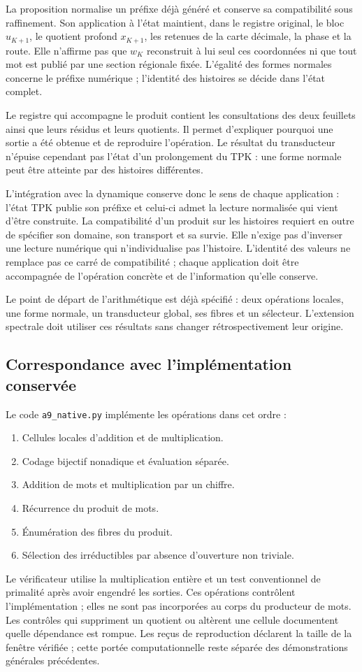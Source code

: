 La proposition normalise un préfixe déjà généré et conserve sa compatibilité sous raffinement. Son application à l'état maintient, dans le registre original, le bloc \(u_{K+1}\), le quotient profond \(x_{K+1}\), les retenues de la carte décimale, la phase et la route. Elle n'affirme pas que \(w_K\) reconstruit à lui seul ces coordonnées ni que tout mot est publié par une section régionale fixée. L'égalité des formes normales concerne le préfixe numérique ; l'identité des histoires se décide dans l'état complet.

Le registre qui accompagne le produit contient les consultations des deux feuillets ainsi que leurs résidus et leurs quotients. Il permet d'expliquer pourquoi une sortie a été obtenue et de reproduire l'opération. Le résultat du transducteur n'épuise cependant pas l'état d'un prolongement du TPK : une forme normale peut être atteinte par des histoires différentes.

L’intégration avec la dynamique conserve donc le sens de chaque application : l’état TPK publie son préfixe et celui-ci admet la lecture normalisée qui vient d’être construite. La compatibilité d’un produit sur les histoires requiert en outre de spécifier son domaine, son transport et sa survie. Elle n’exige pas d’inverser une lecture numérique qui n’individualise pas l’histoire. L’identité des valeurs ne remplace pas ce carré de compatibilité ; chaque application doit être accompagnée de l’opération concrète et de l’information qu’elle conserve.

Le point de départ de l'arithmétique est déjà spécifié : deux opérations locales, une forme normale, un transducteur global, ses fibres et un sélecteur. L'extension spectrale doit utiliser ces résultats sans changer rétrospectivement leur origine.

\subsection{Correspondance avec l'implémentation conservée}
Le code \texttt{a9\_\allowbreak{}native.\allowbreak{}py} implémente les opérations dans cet ordre :

\begin{enumerate}
\item Cellules locales d'addition et de multiplication.
\item Codage bijectif nonadique et évaluation séparée.
\item Addition de mots et multiplication par un chiffre.
\item Récurrence du produit de mots.
\item Énumération des fibres du produit.
\item Sélection des irréductibles par absence d'ouverture non triviale.
\end{enumerate}
Le vérificateur utilise la multiplication entière et un test conventionnel de primalité après avoir engendré les sorties. Ces opérations contrôlent l’implémentation ; elles ne sont pas incorporées au corps du producteur de mots. Les contrôles qui suppriment un quotient ou altèrent une cellule documentent quelle dépendance est rompue. Les reçus de reproduction déclarent la taille de la fenêtre vérifiée ; cette portée computationnelle reste séparée des démonstrations générales précédentes.

